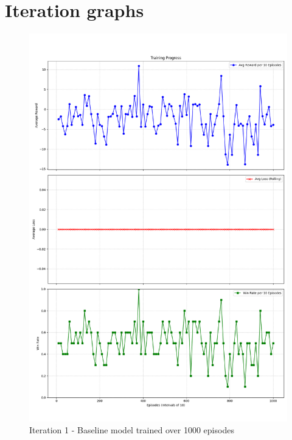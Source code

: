 \section{Iteration graphs}
\label{appendix:iteration-graphs}

\begin{figure}[H]
    \includegraphics[width=.8\textwidth]{assets/Iteration-1-graphs.png}
    \caption{Iteration 1 - Baseline model trained over 1000 episodes}
    \label{fig:iteration-1-graphs}
\end{figure}

\clearpage


